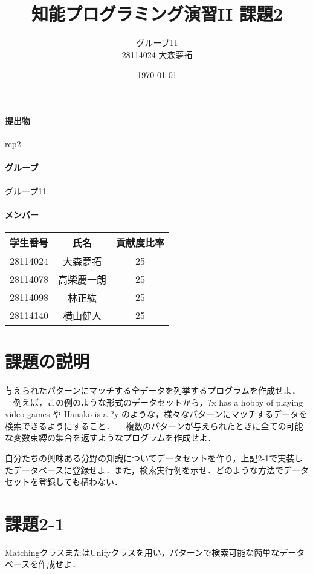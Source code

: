 \documentclass[a4j]{jarticle}
\title{知能プログラミング演習II 課題2}
\author{グループ11\\
  28114024 大森夢拓\\
  }
\date{\today}
\begin{document}
\maketitle
\paragraph{提出物} rep2
\paragraph{グループ} グループ11
\paragraph{メンバー}
\begin{tabular}{|c|c|c|}
  \hline
  学生番号&氏名&貢献度比率\\
  \hline\hline
  28114024&大森夢拓&25\\
  \hline
   28114078&高柴慶一朗&25\\
  \hline
   28114098&林正紘&25\\
  \hline
    28114140&横山健人&25\\
  \hline
\end{tabular}

\section{課題の説明}
\begin{description}
\item[課題2-1]\item 与えられたパターンにマッチする全データを列挙するプログラムを作成せよ．\\
\ \ 例えば，この例のような形式のデータセットから，?x has a hobby of playing video-games や Hanako is a ?y のような，様々なパターンにマッチするデータを検索できるようにすること．
\ \ 複数のパターンが与えられたときに全ての可能な変数束縛の集合を返すようなプログラムを作成せよ．\\

\item[課題2-2] 自分たちの興味ある分野の知識についてデータセットを作り，上記2-1で実装したデータベースに登録せよ．また，検索実行例を示せ．どのような方法でデータセットを登録しても構わない．
\end{description}

\section{課題2-1}
\begin{screen}
MatchingクラスまたはUnifyクラスを用い，パターンで検索可能な簡単なデータベースを作成せよ．
\end{screen}
\end{document}
